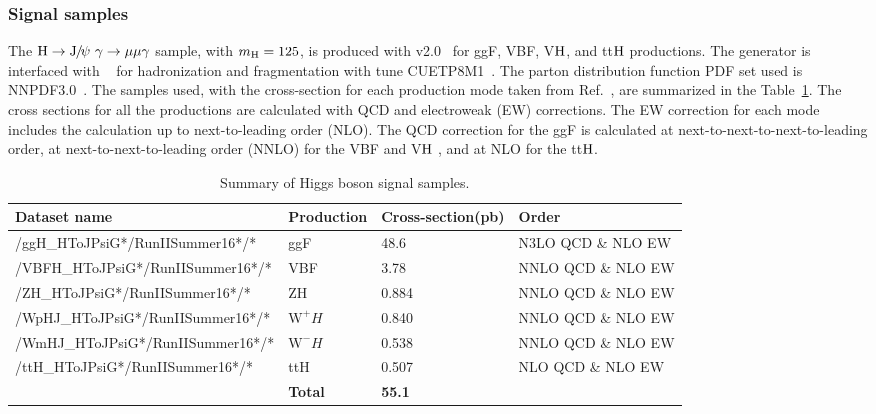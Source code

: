 		\subsubsection*{Signal samples}
		The $\PH\to\JPsi\ \gamma\to\mu\mu\gamma$ sample, with $m_{\mathrm{H}}=125$\GeV, is produced with \POWHEG v2.0~\cite{Alioli:2008tz,Nason:2009ai} for ggF, VBF, V$\mathrm{H}$, and tt$\mathrm{H}$ productions. The generator is interfaced with ~\cite{SJOSTRAND2008852,Sjostrand:2014zea} for hadronization and fragmentation with tune CUETP8M1~\cite{Khachatryan:2015pea}. 
The parton distribution function PDF set used is NNPDF3.0~\cite{Ball:2014uwa}. The samples used, with the cross-section for each production mode taken from Ref.~\cite{LHCHXSWG}, are summarized in the Table~\ref{tab:HiggsSample}. The cross sections for all the productions are calculated with QCD and electroweak (EW) corrections. The EW correction for each mode includes the calculation up to next-to-leading order (NLO). The QCD correction for the ggF is calculated at next-to-next-to-next-to-leading order, at next-to-next-to-leading order (NNLO) for the VBF and V$\mathrm{H}$ , and at NLO for the tt$\mathrm{H}$. 		
		\begin{table}[!ht]
		\scriptsize
		  \begin{center}
		    \begin{tabular}{|l|l|l|l|}
		    \hline
		      Dataset name & Production                                & Cross-section(pb)   & Order                    \\ 
		      \hline
		      /ggH\_HToJPsiG*/RunIISummer16*/* & ggF   & 48.6   & N3LO QCD \& NLO EW  \\
		      /VBFH\_HToJPsiG*/RunIISummer16*/* & VBF   & 3.78   & NNLO QCD \& NLO EW \\
		      /ZH\_HToJPsiG*/RunIISummer16*/* & ZH   & 0.884   & NNLO QCD \& NLO EW  \\
		      /WpHJ\_HToJPsiG*/RunIISummer16*/* & $\text{W}^{+}H$   & 0.840 & NNLO QCD \& NLO EW    \\
		      /WmHJ\_HToJPsiG*/RunIISummer16*/* & $\text{W}^{-}H$   & 0.538  & NNLO QCD \& NLO EW   \\
		      /ttH\_HToJPsiG*/RunIISummer16*/* & ttH   & 0.507    & NLO QCD \& NLO EW \\
		      \hline
		      & \textbf{Total}    & \textbf{55.1} &     \\
		      \hline
		    \end{tabular}
		    \caption{Summary of Higgs boson signal samples.\label{tab:HiggsSample}}
		  \end{center}
		\end{table}
		

